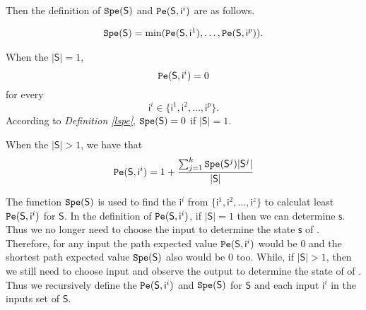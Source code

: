 Then the definition of ${\tt Spe}(\mathsf{S})$ and ${\tt Pe}(\mathsf{S},\mathsf{ i}^{i})$ are as follows.

\begin{definition} \label{lspe}
\begin{equation}
\begin{split}
{\tt Spe}(\mathsf{S})= \min({\tt Pe}(\mathsf{S}, \mathsf{ i}^{1}),\ldots,{\tt Pe}(\mathsf{S}, \mathsf{ i}^{p})).
\end{split}
\end{equation}
\end{definition}

\begin{definition} \label{spe}

When the $|\mathsf{S}|=1$,
\[{\tt Pe}(\mathsf{S}, \mathsf{ i}^{i})=0\]  for every \[\mathsf{ i}^{i} \in \{\mathsf{ i}^{1},\mathsf{ i}^{2},\ldots, \mathsf{ i}^{p}\}.\] According to {\em Definition \ref{lspe}}, ${\tt Spe}(\mathsf{S})=0$ if $|\mathsf{S}|=1$. 

When the $|\mathsf{S}|>1$, 
we have that  
\begin{equation}
\begin{split}
{\tt Pe}(\mathsf{S}, \mathsf{ i}^{i})=1 +\frac{\sum_{j=1}^k {\tt Spe}(\mathsf{S}^{j})|\mathsf{S}^{j}|}{ |\mathsf{S}|}
\end{split}
\end{equation}
\end{definition}

The function ${\tt Spe}(\mathsf{S})$ is used to find the $\mathsf{ i}^{i}$ from $\{\mathsf{ i}^{1},\mathsf{ i}^{2},\ldots, \mathsf{ i}^{z}\}$ to calculat least ${\tt Pe}(\mathsf{S}, \mathsf{ i}^{i})$ for $\mathsf{S}$. In the definition of ${\tt Pe}(\mathsf{S}, \mathsf{ i}^{i})$, if $|\mathsf{S}|=1$ then we can determine $\mathsf{s}$. Thus we no longer need to choose the input to determine the state $\mathsf{s}$ of \BCNs. Therefore, for any input the path expected value ${\tt Pe}(\mathsf{S}, \mathsf{ i}^{i})$ would be $0$ and the shortest path expected value ${\tt Spe}(\mathsf{S})$ also would be $0$ too. While, if $|\mathsf{S}|>1$, then we still need to choose input and observe the output to determine the state of of \BCNs. Thus we recursively define the ${\tt Pe}(\mathsf{S}, \mathsf{ i}^{i})$ and ${\tt Spe}(\mathsf{S})$ for $\mathsf{S}$ and each input $\mathsf{ i}^{i}$ in the inputs set of $\mathsf{S}$. 

